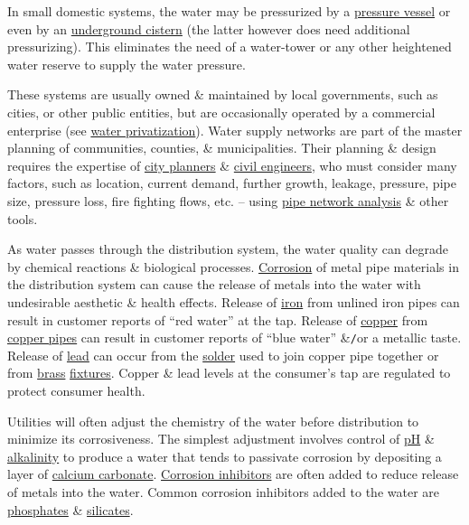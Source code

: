 \documentclass[oneside]{book}
\numberwithin{equation}{section}
\begin{document}
In small domestic systems, the water may be pressurized by a \href{https://en.wikipedia.org/wiki/Pressure_vessel}{pressure vessel} or even by an \href{https://en.wikipedia.org/wiki/Water_well}{underground cistern} (the latter however does need additional pressurizing). This eliminates the need of a water-tower or any other heightened water reserve to supply the water pressure.

These systems are usually owned \& maintained by local governments, such as cities, or other public entities, but are occasionally operated by a commercial enterprise (see \href{https://en.wikipedia.org/wiki/Water_privatization}{water privatization}). Water supply networks are part of the master planning of communities, counties, \& municipalities. Their planning \& design requires the expertise of \href{https://en.wikipedia.org/wiki/Urban_planner}{city planners} \& \href{https://en.wikipedia.org/wiki/Civil_engineering}{civil engineers}, who must consider many factors, such as location, current demand, further growth, leakage, pressure, pipe size, pressure loss, fire fighting flows, etc. -- using \href{https://en.wikipedia.org/wiki/Pipe_network_analysis}{pipe network analysis} \& other tools.

As water passes through the distribution system, the water quality can degrade by chemical reactions \& biological processes. \href{https://en.wikipedia.org/wiki/Corrosion}{Corrosion} of metal pipe materials in the distribution system can cause the release of metals into the water with undesirable aesthetic \& health effects. Release of \href{https://en.wikipedia.org/wiki/Iron}{iron} from unlined iron pipes can result in customer reports of ``red water'' at the tap. Release of \href{https://en.wikipedia.org/wiki/Copper}{copper} from \href{https://en.wikipedia.org/wiki/Domestic_water_system}{copper pipes} can result in customer reports of ``blue water'' \&\texttt{/}or a metallic taste. Release of \href{https://en.wikipedia.org/wiki/Lead}{lead} can occur from the \href{https://en.wikipedia.org/wiki/Solder}{solder} used to join copper pipe together or from \href{https://en.wikipedia.org/wiki/Brass}{brass} \href{https://en.wikipedia.org/wiki/Plumbing_fixture}{fixtures}. Copper \& lead levels at the consumer's tap are regulated to protect consumer health.

Utilities will often adjust the chemistry of the water before distribution to minimize its corrosiveness. The simplest adjustment involves control of \href{https://en.wikipedia.org/wiki/PH}{pH} \& \href{https://en.wikipedia.org/wiki/Alkalinity}{alkalinity} to produce a water that tends to passivate corrosion by depositing a layer of \href{https://en.wikipedia.org/wiki/Calcium_carbonate}{calcium carbonate}. \href{https://en.wikipedia.org/wiki/Corrosion_inhibitors}{Corrosion inhibitors} are often added to reduce release of metals into the water. Common corrosion inhibitors added to the water are \href{https://en.wikipedia.org/wiki/Phosphates}{phosphates} \& \href{https://en.wikipedia.org/wiki/Silicates}{silicates}.
\end{document}

